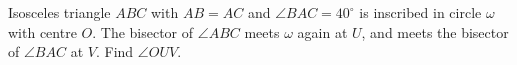 Isosceles triangle $ABC$ with $AB=AC$ and $\angle BAC=40^\circ$ is inscribed in circle $\omega$ with centre $O$. The bisector of $\angle ABC$ meets $\omega$ again at $U$, and meets the bisector of $\angle BAC$ at $V$. Find $\angle OUV$.

